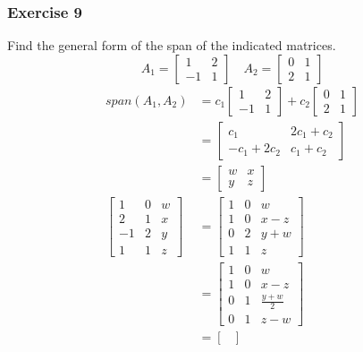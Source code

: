 \documentclass[letterpaper, 12pt]{math}
\begin{document}
\subsubsection*{Exercise 9}
Find the general form of the span of the indicated matrices.
\[ A_1 = \begin{bmatrix}1 & 2 \\ -1 & 1\end{bmatrix} \quad
  A_2 = \begin{bmatrix}0 & 1 \\ 2 & 1\end{bmatrix} \]
\begin{align*}
  span(A_1,A_2) &= c_1\begin{bmatrix}1 & 2 \\ -1 & 1\end{bmatrix}+
    c_2\begin{bmatrix}0 & 1 \\ 2 & 1\end{bmatrix} \\
  &= \begin{bmatrix}
    c_1 & 2c_1+c_2 \\
    -c_1+2c_2 & c_1+c_2
  \end{bmatrix} \\
  &= \begin{bmatrix}
    w & x \\
    y & z
  \end{bmatrix} \\
  \left[\begin{array}{cc|c}
    1 & 0 & w \\
    2 & 1 & x \\
    -1 & 2 & y \\
    1 & 1 & z
  \end{array}\right] &= \begin{bmatrix}
    1 & 0 & w \\
    1 & 0 & x-z \\
    0 & 2 & y+w \\
    1 & 1 & z
  \end{bmatrix} \\
  &= \begin{bmatrix}
    1 & 0 & w \\
    1 & 0 & x-z \\
    0 & 1 & \frac{y+w}{2} \\
    0 & 1 & z-w
  \end{bmatrix} \\
  &= \begin{bmatrix}

\end{bmatrix}
\end{align*}
\end{document}
